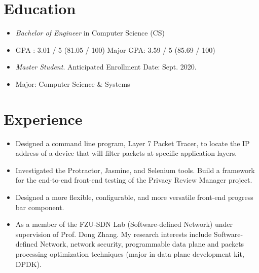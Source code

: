 \documentclass{resume}
\begin{document}



\section{Education}
\begin{itemize}
  \item \textit{Bachelor of Engineer} in Computer Science (CS)
  \item GPA : 3.01 / 5 (81.05 / 100) Major GPA: 3.59 / 5 (85.69 / 100)
\end{itemize}

\begin{itemize}
  \item \textit{Master Student}. Anticipated Enrollment Date: Sept. 2020.
  \item Major: Computer Science \& Systems
\end{itemize}


\section{Experience}
\begin{itemize}
  \item Designed a command line program, Layer 7 Packet Tracer, to locate the IP address of a device that will filter packets at specific application layers.
  \item Investigated the Protractor, Jasmine, and Selenium tools. Build a framework for the end-to-end front-end testing of the Privacy Review Manager project.
  \item Designed a more flexible, configurable, and more versatile front-end progress bar component.
\end{itemize}

\begin{itemize}
  \item As a member of the FZU-SDN Lab (Software-defined Network) under supervision of Prof. Dong Zhang. My research
  interests include Software-defined Network, network security, programmable data plane and packets processing
  optimization techniques (major in data plane development kit, DPDK).
\end{itemize}
\end{document}
